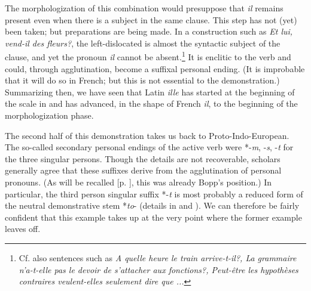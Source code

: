 The morphologization of this combination would presuppose that \textit{il} remains present even when there is a subject in the same clause. This step has not (yet) been taken; but preparations are being made. In a construction such as \textit{Et lui, vend-il des fleurs?}, the left-dislocated \np is almost the syntactic subject of the clause, and yet the pronoun \textit{il} cannot be absent.\footnote{Cf. also sentences such as \textit{A quelle heure le train arrive-t-il?, La grammaire n'a-t-elle pas le devoir de s'attacher aux fonctions?, Peut-être les hypothèses contraires veulent-elles seulement dire que ...}} It is enclitic to the verb and could, through agglutination, become a suffixal personal ending. (It is improbable that it will do so in French; but this is not essential to the demonstration.) Summarizing then, we have seen that Latin \textit{ille} has started at the beginning of the scale in  and has advanced, in the shape of French \textit{il}, to the beginning of the morphologization phase.

The second half of this demonstration takes us back to Proto-Indo-European. The so-called secondary personal endings of the active verb were *-\textit{m}, -\textit{s}, -\textit{t} for the three singular persons. Though the details are not recoverable, scholars generally agree that these suffixes derive from the agglutination of personal pronouns. (As will be recalled [p. \pageref{Bopp}], this was already Bopp's position.) In particular, the third person singular suffix *-\textit{t} is most probably a reduced form of the neutral demonstrative stem *\textit{to}{}- (details in \citealt[302--305]{Szemerényi1970} and \citealt{Seebold1971}). We can therefore be fairly confident that this example takes up at the very point where the former example leaves off.

